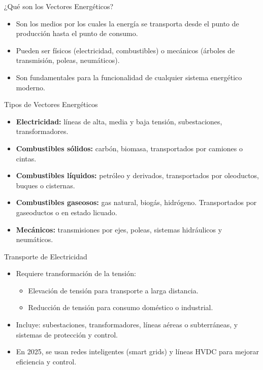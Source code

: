 \documentclass[main.tex]{subfiles}
\begin{document}
\begin{frame}{¿Qué son los Vectores Energéticos?}
  \begin{itemize}
    \item Son los medios por los cuales la energía se transporta desde el punto de producción hasta el punto de consumo.
    \item Pueden ser físicos (electricidad, combustibles) o mecánicos (árboles de transmisión, poleas, neumáticos).
    \item Son fundamentales para la funcionalidad de cualquier sistema energético moderno.
  \end{itemize}
\end{frame}

\begin{frame}{Tipos de Vectores Energéticos}
  \begin{itemize}
    \item \textbf{Electricidad:} líneas de alta, media y baja tensión, subestaciones, transformadores.
    \item \textbf{Combustibles sólidos:} carbón, biomasa, transportados por camiones o cintas.
    \item \textbf{Combustibles líquidos:} petróleo y derivados, transportados por oleoductos, buques o cisternas.
    \item \textbf{Combustibles gaseosos:} gas natural, biogás, hidrógeno. Transportados por gaseoductos o en estado licuado.
    \item \textbf{Mecánicos:} transmisiones por ejes, poleas, sistemas hidráulicos y neumáticos.
  \end{itemize}
\end{frame}

\begin{frame}{Transporte de Electricidad}
  \begin{itemize}
    \item Requiere transformación de la tensión:
    \begin{itemize}
      \item Elevación de tensión para transporte a larga distancia.
      \item Reducción de tensión para consumo doméstico o industrial.
    \end{itemize}
    \item Incluye: subestaciones, transformadores, líneas aéreas o subterráneas, y sistemas de protección y control.
    \item En 2025, se usan redes inteligentes (smart grids) y líneas HVDC para mejorar eficiencia y control.
  \end{itemize}
\end{frame}
\end{document}
